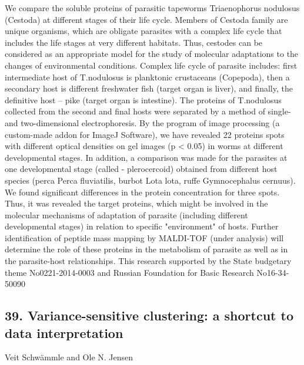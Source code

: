 We compare the soluble proteins of parasitic tapeworms Triaenophorus nodulosus (Cestoda) at different stages of their life cycle. Members of Cestoda family are unique organisms, which are obligate parasites with a complex life cycle that includes the life stages at very different habitats. Thus, cestodes can be considered as an appropriate model for the study of molecular adaptations to the changes of environmental conditions. Complex life cycle of parasite includes: first intermediate host of T.nodulosus is planktonic crustaceans (Copepoda), then a secondary host is different freshwater fish (target organ is liver), and finally, the definitive host – pike (target organ is intestine). The proteins of T.nodulosus collected from the second and final hosts were separated by a method of single- and two-dimensional electrophoresis. By the program of image processing (a custom-made addon for ImageJ Software), we have revealed 22 proteins spots with different optical densities on gel images (p < 0.05) in worms at different developmental stages. In addition, a comparison was made for the parasites at one developmental stage (called - plerocercoid) obtained from different host species (perca Perca fluviatilis, burbot Lota lota, ruffe Gymnocephalus cernuus). We found significant differences in the protein concentration for three spots. Thus, it was revealed the target proteins, which might be involved in the molecular mechanisms of adaptation of parasite (including different developmental stages) in relation to specific "environment" of hosts. Further identification of peptide mass mapping by MALDI-TOF (under analysis) will determine the role of these proteins in the metabolism of parasite as well as in the parasite-host relationships. This research supported by the State budgetary theme No0221-2014-0003 and Russian Foundation for Basic Research No16-34-50090

\subsection*{\color{eubicRed} 39. Variance-sensitive clustering: a shortcut to data interpretation}
{\color{eubicGray} Veit Schw\"ammle and Ole N. Jensen}


